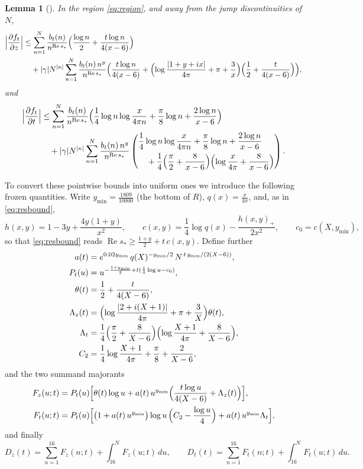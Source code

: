 \documentclass[11pt]{article}
\newtheorem{lemma}[theorem]{Lemma}
\theoremstyle{definition}
\DeclareMathOperator{\Rea}{Re}
\begin{document}
\begin{lemma}[{\cite[Lemma~8.4]{Polymath}}]\label{lem:polyderiv}
In the region \eqref{eq:region}, and away from the jump
discontinuities of $N$,
\begin{align*}
\Bigl|\frac{\partial f_t}{\partial z}\Bigr|
&\le\sum_{n=1}^{N}\frac{b_t(n)}{n^{\Rea s_*}}
\Bigl(\frac{\log n}2+\frac{t\log n}{4(x-6)}\Bigr)\\
&\quad+|\gamma|N^{|\kappa|}\sum_{n=1}^{N}
\frac{b_t(n)\,n^y}{n^{\Rea s_*}}
\Bigl(\frac{t\log n}{4(x-6)}
+\Bigl(\log\frac{|1+y+ix|}{4\pi}+\pi+\frac3x\Bigr)
\Bigl(\frac12+\frac t{4(x-6)}\Bigr)\Bigr),
\end{align*}
and
\begin{align*}
\Bigl|\frac{\partial f_t}{\partial t}\Bigr|
&\le\sum_{n=1}^{N}\frac{b_t(n)}{n^{\Rea s_*}}
\Bigl(\frac14\log n\log\frac x{4\pi n}
+\frac\pi8\log n+\frac{2\log n}{x-6}\Bigr)\\
&\quad+|\gamma|N^{|\kappa|}\sum_{n=1}^{N}
\frac{b_t(n)\,n^y}{n^{\Rea s_*}}
\left(\begin{aligned}
&\frac14\log n\log\frac x{4\pi n}
+\frac\pi8\log n+\frac{2\log n}{x-6}\\
&\quad+\frac14\Bigl(\frac\pi2+\frac8{x-6}\Bigr)
\Bigl(\log\frac x{4\pi}+\frac8{x-6}\Bigr)
\end{aligned}\right).
\end{align*}
\end{lemma}

To convert these pointwise bounds into uniform ones we introduce the
following frozen quantities. Write $y_{\min}=\frac{1809}{10000}$
(the bottom of $R$), $q(x)=\frac x{4\pi}$, and, as in
\eqref{eq:resbound},
\[
h(x,y)=1-3y+\frac{4y(1+y)}{x^2},
\qquad
c(x,y)=\frac14\log q(x)-\frac{h(x,y)_+}{2x^2},
\qquad
c_0=c(X,y_{\min}),
\]
so that \eqref{eq:resbound} reads
$\Rea s_*\ge\frac{1+y}2+t\,c(x,y)$. Define further
\begin{align*}
a(t) &= e^{0.02y_{\min}}\,q(X)^{-y_{\min}/2}\,
N^{\,t\,y_{\min}/(2(X-6))},
\\
P_t(u) &= u^{-\frac{1+y_{\min}}2+t(\frac14\log u-c_0)},
\\
\theta(t) &= \frac12+\frac t{4(X-6)},
\\
\Lambda_z(t) &= \Bigl(\log\frac{|2+i(X+1)|}{4\pi}+\pi+\frac3X\Bigr)
\theta(t),
\\
\Lambda_t &= \frac14\Bigl(\frac\pi2+\frac8{X-6}\Bigr)
\Bigl(\log\frac{X+1}{4\pi}+\frac8{X-6}\Bigr),
\\
C_2 &= \frac14\log\frac{X+1}{4\pi}+\frac\pi8+\frac2{X-6},
\end{align*}
and the two summand majorants
\begin{align*}
F_z(u;t)&=P_t(u)\Bigl[\theta(t)\log u
+a(t)\,u^{y_{\min}}\Bigl(\frac{t\log u}{4(X-6)}
+\Lambda_z(t)\Bigr)\Bigr],\\
F_t(u;t)&=P_t(u)\Bigl[\bigl(1+a(t)\,u^{y_{\min}}\bigr)
\log u\,\Bigl(C_2-\frac{\log u}4\Bigr)
+a(t)\,u^{y_{\min}}\Lambda_t\Bigr],
\end{align*}
and finally
\[
D_z(t)=\sum_{n=1}^{16}F_z(n;t)+\int_{16}^{N}F_z(u;t)\,du,
\qquad
D_t(t)=\sum_{n=1}^{16}F_t(n;t)+\int_{16}^{N}F_t(u;t)\,du .
\]
\end{document}
